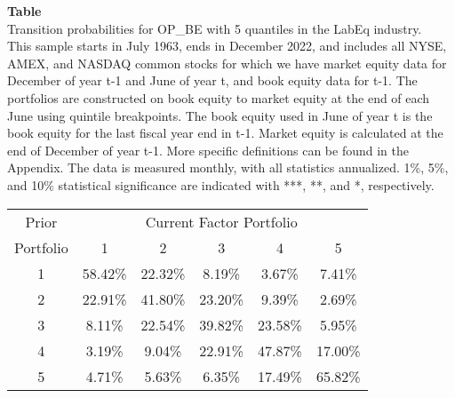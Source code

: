 \begin{table*}[ht!]
\raggedright
{}
\label{tab: transition_probs_OP_BE_LabEq_with_5_quantiles}
\textbf{Table \thetable} \\
Transition probabilities for OP_BE with 5 quantiles in the LabEq industry. \\
\hspace*{1em}This sample starts in July 1963, ends in December 2022, and includes all NYSE, AMEX, and NASDAQ common stocks for which we have market equity data for December of year t-1 and June of year t, and book equity data for t-1. The portfolios are constructed on book equity to market equity at the end of each June using quintile breakpoints.  The book equity used in June of year t is the book equity for the last fiscal year end in t-1.  Market equity is calculated at the end of December of year t-1.  More specific definitions can be found in the Appendix.  The data is measured monthly, with all statistics annualized.  1\%, 5\%, and 10\% statistical significance are indicated with ***, **, and *, respectively. \\
\vspace{0.5em}
\centering
\begin{adjustbox}{max width=\textwidth}
\begin{tabular}{@{}cccccc@{}}
\toprule
Prior & \multicolumn{5}{c}{Current Factor Portfolio} \\
Portfolio & 1 & 2 & 3 & 4 & 5 \\
\midrule
1 & 58.42\% & 22.32\% & 8.19\% & 3.67\% & 7.41\% \\
2 & 22.91\% & 41.80\% & 23.20\% & 9.39\% & 2.69\% \\
3 & 8.11\% & 22.54\% & 39.82\% & 23.58\% & 5.95\% \\
4 & 3.19\% & 9.04\% & 22.91\% & 47.87\% & 17.00\% \\
5 & 4.71\% & 5.63\% & 6.35\% & 17.49\% & 65.82\% \\
\bottomrule
\end{tabular}
\end{adjustbox}
\end{table*}